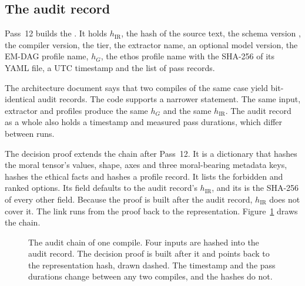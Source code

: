 \subsection{The audit record}

Pass~12 builds the . It holds $h_{\mathrm{IR}}$, the hash of the source text, the
schema version , the compiler version, the tier, the extractor
name, an optional model version, the EM-DAG profile name, $h_G$, the ethos profile name with the
SHA-256 of its YAML file, a UTC timestamp and the list of pass records.

The architecture document says that two compiles of the same case yield bit-identical audit
records. The code supports a narrower statement. The same input, extractor and profiles produce
the same $h_G$ and the same $h_{\mathrm{IR}}$. The audit record as a whole also holds a timestamp
and measured pass durations, which differ between runs.

The decision proof extends the chain after Pass~12. It is a dictionary that hashes the moral
tensor's values, shape, axes and three moral-bearing metadata keys, hashes the ethical facts and
hashes a profile record. It lists the forbidden and ranked options. Its 
field defaults to the audit record's $h_{\mathrm{IR}}$, and its  is the SHA-256
of every other field. Because the proof is built after the audit record, $h_{\mathrm{IR}}$ does not
cover it. The link runs from the proof back to the representation.
Figure~\ref{fig:compiler-audit} draws the chain.

\begin{figure}[t]
\centering

\caption{The audit chain of one compile. Four inputs are hashed into the audit record. The
decision proof is built after it and points back to the representation hash, drawn dashed. The timestamp and the pass durations
change between any two compiles, and the hashes do not.}
\label{fig:compiler-audit}
\end{figure}

